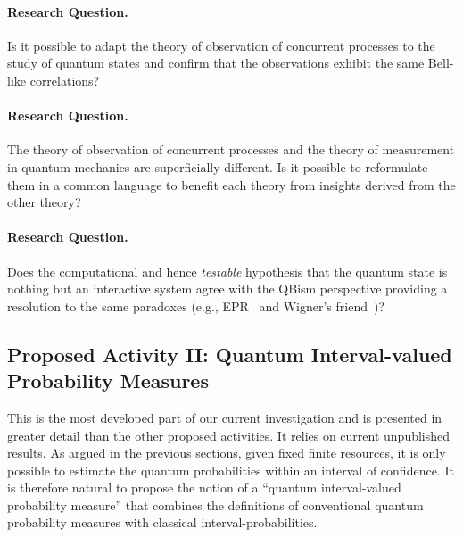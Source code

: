 \documentclass{article}
\theoremstyle{remark}
\begin{document}
\paragraph*{Research Question.} Is it possible to adapt the theory of
observation of concurrent processes to the study of quantum states and
confirm that the observations exhibit the same Bell-like correlations?

\paragraph*{Research Question.} The theory of observation of
concurrent processes and the theory of measurement in quantum
mechanics are superficially different. Is it possible to reformulate
them in a common language to benefit each theory from insights derived
from the other theory?

\paragraph*{Research Question.} Does the computational and hence
\emph{testable} hypothesis that the quantum state is nothing but an
interactive system agree with the QBism perspective providing a
resolution to the same paradoxes (e.g., EPR~\cite{EPR1935} and Wigner's
friend~\cite{Wigner1961,Fuchs2010,Fuchs2012})?

\subsection{Proposed Activity II: Quantum Interval-valued Probability Measures}
 
This is the most developed part of our current investigation and is
presented in greater detail than the other proposed activities. It
relies on current unpublished results. As argued in the previous
sections, given fixed finite resources, it is only possible to
estimate the quantum probabilities within an interval of
confidence. It is therefore natural to propose the notion of a
``quantum interval-valued probability measure'' that combines the
definitions of conventional quantum probability measures with
classical interval-probabilities.
\end{document}
